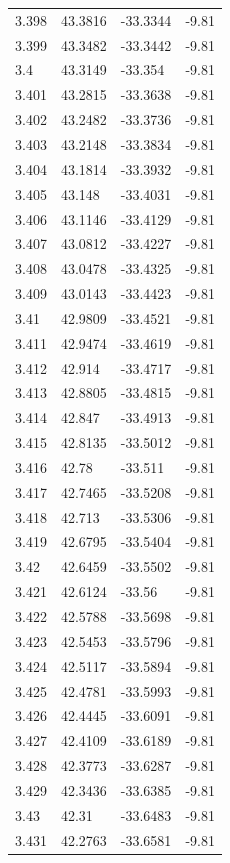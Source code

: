 \begin{tabular}{llll}
3.398 & 43.3816 & -33.3344 & -9.81 \\
3.399 & 43.3482 & -33.3442 & -9.81 \\
3.4 & 43.3149 & -33.354 & -9.81 \\
3.401 & 43.2815 & -33.3638 & -9.81 \\
3.402 & 43.2482 & -33.3736 & -9.81 \\
3.403 & 43.2148 & -33.3834 & -9.81 \\
3.404 & 43.1814 & -33.3932 & -9.81 \\
3.405 & 43.148 & -33.4031 & -9.81 \\
3.406 & 43.1146 & -33.4129 & -9.81 \\
3.407 & 43.0812 & -33.4227 & -9.81 \\
3.408 & 43.0478 & -33.4325 & -9.81 \\
3.409 & 43.0143 & -33.4423 & -9.81 \\
3.41 & 42.9809 & -33.4521 & -9.81 \\
3.411 & 42.9474 & -33.4619 & -9.81 \\
3.412 & 42.914 & -33.4717 & -9.81 \\
3.413 & 42.8805 & -33.4815 & -9.81 \\
3.414 & 42.847 & -33.4913 & -9.81 \\
3.415 & 42.8135 & -33.5012 & -9.81 \\
3.416 & 42.78 & -33.511 & -9.81 \\
3.417 & 42.7465 & -33.5208 & -9.81 \\
3.418 & 42.713 & -33.5306 & -9.81 \\
3.419 & 42.6795 & -33.5404 & -9.81 \\
3.42 & 42.6459 & -33.5502 & -9.81 \\
3.421 & 42.6124 & -33.56 & -9.81 \\
3.422 & 42.5788 & -33.5698 & -9.81 \\
3.423 & 42.5453 & -33.5796 & -9.81 \\
3.424 & 42.5117 & -33.5894 & -9.81 \\
3.425 & 42.4781 & -33.5993 & -9.81 \\
3.426 & 42.4445 & -33.6091 & -9.81 \\
3.427 & 42.4109 & -33.6189 & -9.81 \\
3.428 & 42.3773 & -33.6287 & -9.81 \\
3.429 & 42.3436 & -33.6385 & -9.81 \\
3.43 & 42.31 & -33.6483 & -9.81 \\
3.431 & 42.2763 & -33.6581 & -9.81 \\

\end{tabular}
